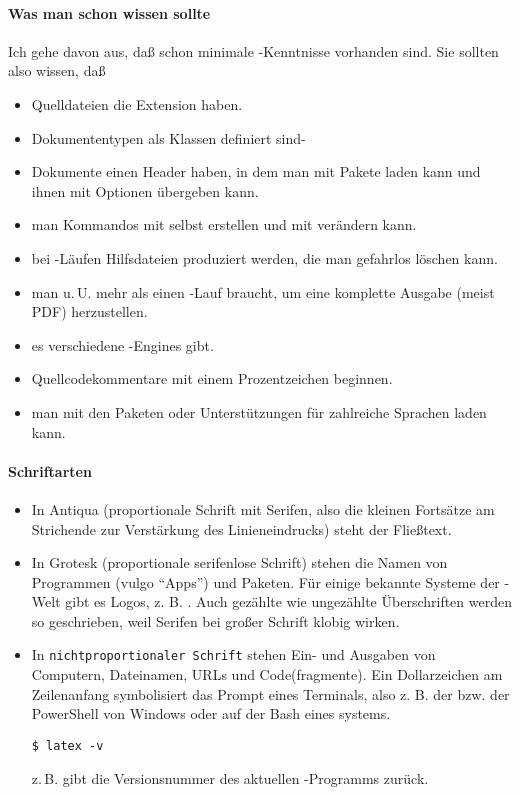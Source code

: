 \documentclass[
	11pt,        %
	table,       %
	twoside,     %
	notitlepage, %
]{scrreprt}
\begin{document}
\paragraph{Was man schon wissen sollte}
Ich gehe davon aus, daß schon minimale \LaTeXi-Kenntnisse vorhanden sind. Sie sollten also wissen, daß \textellipsis
\begin{itemize}
\item \textellipsis Quelldateien die Extension  haben.
\item \textellipsis Dokumententypen als Klassen definiert sind-
\item \textellipsis Dokumente einen Header haben, in dem man mit  Pakete laden kann und ihnen mit \Kbd{[key=value]} Optionen übergeben kann.
\item \textellipsis man Kommandos mit  selbst erstellen und mit  verändern kann.
\item \textellipsis bei \LaTeXi-Läufen Hilfsdateien produziert werden, die man gefahrlos löschen kann.
\item \textellipsis man u.\,U. mehr als einen \LaTeXi-Lauf braucht, um eine komplette Ausgabe (meist PDF) herzustellen.
\item \textellipsis es verschiedene \LaTeXi-Engines gibt.
\item \textellipsis Quellcodekommentare mit einem Prozentzeichen beginnen.
\item \textellipsis man mit den Paketen  oder  Unterstützungen für zahlreiche Sprachen laden kann.
\end{itemize}

\paragraph{Schriftarten}
\begin{itemize}
\item In Antiqua (proportionale Schrift mit Serifen, also die kleinen Fortsätze am Strichende zur Verstärkung des Linieneindrucks) steht der Fließtext.
\item In \textsf{Grotesk} (proportionale serifenlose Schrift) stehen die Namen von Programmen (vulgo \enquote{Apps}) und Paketen. Für einige bekannte Systeme der \TeXi-Welt gibt es Logos, z. B. \LaTeXi. Auch gezählte wie ungezählte Überschriften werden so geschrieben, weil Serifen bei großer Schrift klobig wirken.
\item In \texttt{nichtproportionaler Schrift} stehen Ein- und Ausgaben von Computern, Dateinamen, URLs und Code(fragmente). Ein Dollarzeichen am Zeilenanfang symbolisiert das Prompt eines Terminals, also z. B.  der  bzw.  der PowerShell von Windows oder  auf der Bash eines systems.
\begin{lstlisting}
$ latex -v
\end{lstlisting}
z.\,B. gibt die Versionsnummer des aktuellen \LaTeXi-Programms zurück.
\end{itemize}
\end{document}
